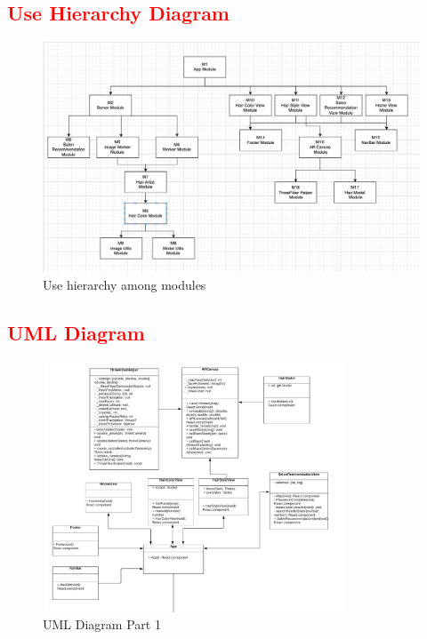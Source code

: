 \documentclass[12pt, titlepage]{article}
\begin{document}
\subsection{\textcolor{red}{Use Hierarchy Diagram}}
\begin{center}
\begin{figure}[H]
\includegraphics[width=1\textwidth]{Design/SoftArchitecture/use_hierarchy_new.png}
\caption{Use hierarchy among modules}
\label{FigUH} 
\end{figure}
\end{center}

\subsection{\textcolor{red}{UML Diagram}}
\begin{center}
\begin{figure}[]
\includegraphics[width=0.8\textwidth, scale=1.5, keepaspectratio]{Design/SoftArchitecture/uml1.png}
\caption{UML Diagram Part 1}
\label{FigUH} 
\end{figure}
\end{center}
\end{document}
